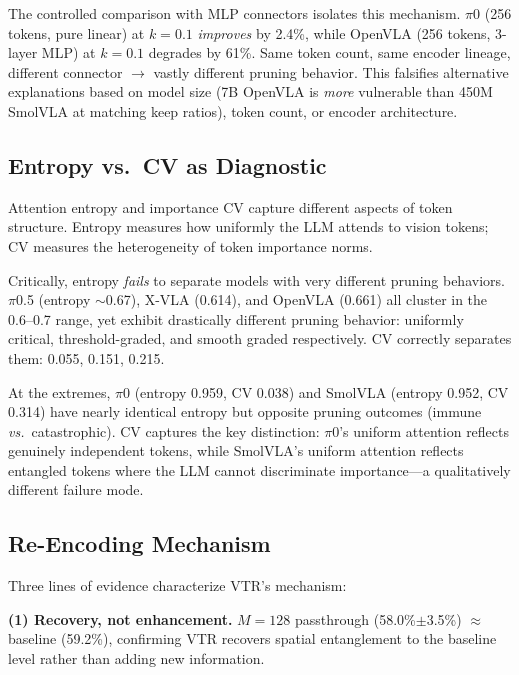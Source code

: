\documentclass[10pt,letterpaper]{article}
\newcommand{\vs}{\textit{vs.}}
\begin{document}
The controlled comparison with MLP connectors isolates this mechanism. $\pi$0 (256 tokens, pure linear) at $k\!=\!0.1$ \emph{improves} by 2.4\%, while OpenVLA (256 tokens, 3-layer MLP) at $k\!=\!0.1$ degrades by 61\%. Same token count, same encoder lineage, different connector $\to$ vastly different pruning behavior. This falsifies alternative explanations based on model size (7B OpenVLA is \emph{more} vulnerable than 450M SmolVLA at matching keep ratios), token count, or encoder architecture.


\subsection{Entropy vs.\ CV as Diagnostic}
\label{sec:entropy_cv}

Attention entropy and importance CV capture different aspects of token structure. Entropy measures how uniformly the LLM attends to vision tokens; CV measures the heterogeneity of token importance norms.

Critically, entropy \emph{fails} to separate models with very different pruning behaviors. $\pi$0.5 (entropy $\sim$0.67), X-VLA (0.614), and OpenVLA (0.661) all cluster in the 0.6--0.7 range, yet exhibit drastically different pruning behavior: uniformly critical, threshold-graded, and smooth graded respectively. CV correctly separates them: 0.055, 0.151, 0.215.

At the extremes, $\pi$0 (entropy 0.959, CV 0.038) and SmolVLA (entropy 0.952, CV 0.314) have nearly identical entropy but opposite pruning outcomes (immune \vs\ catastrophic). CV captures the key distinction: $\pi$0's uniform attention reflects genuinely independent tokens, while SmolVLA's uniform attention reflects entangled tokens where the LLM cannot discriminate importance---a qualitatively different failure mode.

\subsection{Re-Encoding Mechanism}
\label{sec:reencoding}

Three lines of evidence characterize VTR's mechanism:

\textbf{(1) Recovery, not enhancement.} $M\!=\!128$ passthrough (58.0\%$\pm$3.5\%) $\approx$ baseline (59.2\%), confirming VTR recovers spatial entanglement to the baseline level rather than adding new information.
\end{document}
